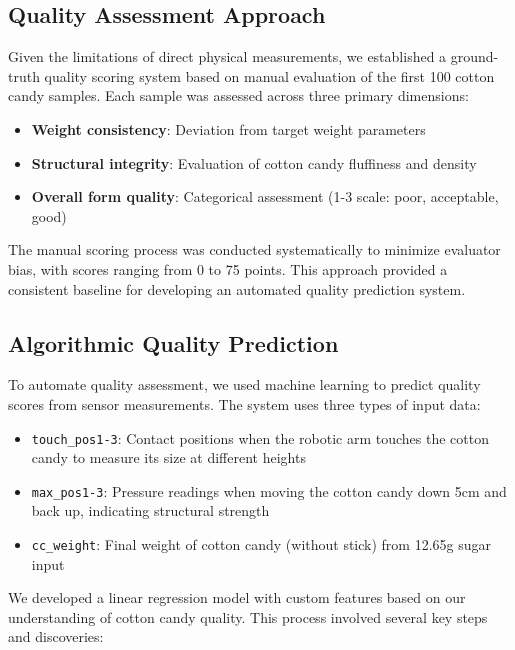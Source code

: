 \subsection{Quality Assessment Approach}

Given the limitations of direct physical measurements, we established a ground-truth quality scoring system based on manual evaluation of the first 100 cotton candy samples. Each sample was assessed across three primary dimensions:

\begin{itemize}
    \item \textbf{Weight consistency}: Deviation from target weight parameters
    \item \textbf{Structural integrity}: Evaluation of cotton candy fluffiness and density
    \item \textbf{Overall form quality}: Categorical assessment (1-3 scale: poor, acceptable, good)
\end{itemize}

The manual scoring process was conducted systematically to minimize evaluator bias, with scores ranging from 0 to 75 points. This approach provided a consistent baseline for developing an automated quality prediction system.

\subsection{Algorithmic Quality Prediction}

To automate quality assessment, we used machine learning to predict quality scores from sensor measurements. The system uses three types of input data:

\begin{itemize}
    \item \texttt{touch\_pos1-3}: Contact positions when the robotic arm touches the cotton candy to measure its size at different heights
    \item \texttt{max\_pos1-3}: Pressure readings when moving the cotton candy down 5cm and back up, indicating structural strength
    \item \texttt{cc\_weight}: Final weight of cotton candy (without stick) from 12.65g sugar input
\end{itemize}

We developed a linear regression model with custom features based on our understanding of cotton candy quality. This process involved several key steps and discoveries:

